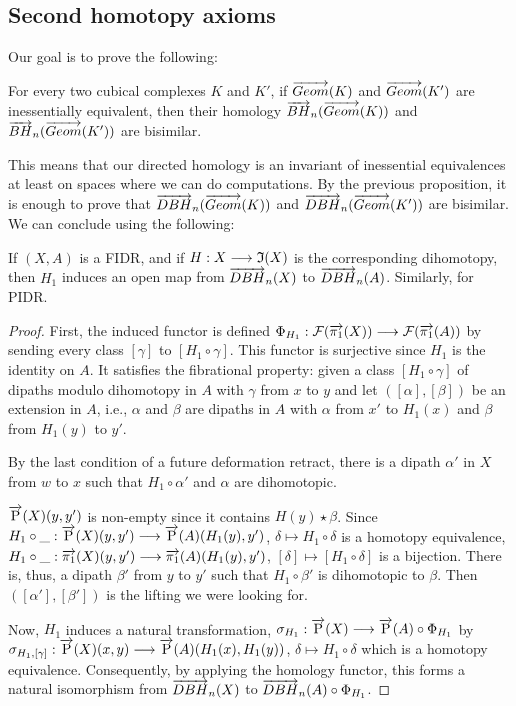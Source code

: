 \subsection{Second homotopy axioms}


Our goal is to prove the following:

\begin{theo}
For every two cubical complexes $K$ and $K'$, if $\overrightarrow{Geom}(K)$ and $\overrightarrow{Geom}(K')$ are inessentially equivalent, then their homology $\overrightarrow{BH}_{n}(\overrightarrow{Geom}(K))$ and $\overrightarrow{BH}_{n}(\overrightarrow{Geom}(K'))$ are bisimilar.
\end{theo}

This means that our directed homology is an invariant of inessential equivalences at least on spaces where we can do computations. By the previous proposition, it is enough to prove that $\overrightarrow{DBH}_{n}(\overrightarrow{Geom}(K))$ and $\overrightarrow{DBH}_{n}(\overrightarrow{Geom}(K'))$ are bisimilar. We can conclude using the following:

\begin{lemme}
If $(X,A)$ is a FIDR, and if $H : X \longrightarrow \mathfrak{I}(X)$ is the corresponding dihomotopy, then $H_1$ induces an open map from $\overrightarrow{DBH}_{n}(X)$ to $\overrightarrow{DBH}_{n}(A)$. Similarly, for PIDR.
\end{lemme}

\begin{proof}
First, the induced functor is defined $\Phi_{H_1} : \mathcal{F}(\overrightarrow{\pi_1}(X)) \longrightarrow \mathcal{F}(\overrightarrow{\pi_1}(A))$ by sending every class $[\gamma]$ to $[H_1\circ\gamma]$. This functor is surjective since $H_1$ is the identity on $A$. It satisfies the fibrational property: given a class $[H_1\circ\gamma]$ of dipaths modulo dihomotopy in $A$ with $\gamma$ from $x$ to $y$ and let $([\alpha],[\beta])$ be an extension in $A$, i.e., $\alpha$ and $\beta$ are dipaths in $A$ with $\alpha$ from $x'$ to $H_1(x)$ and $\beta$ from $H_1(y)$ to $y'$.

By the last condition of a future deformation retract, there is a dipath $\alpha'$ in $X$ from $w$ to $x$ such that $H_1\circ\alpha'$ and $\alpha$ are dihomotopic.

$\overrightarrow{\text{P}}(X)(y,y')$ is non-empty since it contains $H(y)\star\beta$. Since $H_1\circ\_ : \overrightarrow{\text{P}}(X)(y,y') \longrightarrow \overrightarrow{\text{P}}(A)(H_1(y),y')$, $\delta \longmapsto H_1\circ\delta$ is a homotopy equivalence, $H_1\circ\_ : \overrightarrow{\pi_1}(X)(y,y') \longrightarrow \overrightarrow{\pi_1}(A)(H_1(y),y')$, $[\delta] \longmapsto [H_1\circ\delta]$ is a bijection. There is, thus, a dipath $\beta'$ from $y$ to $y'$ such that $H_1\circ\beta'$ is dihomotopic to $\beta$.
Then $([\alpha'],[\beta'])$ is the lifting we were looking for.

Now, $H_1$ induces a natural transformation, $\sigma_{H_1} : \overrightarrow{\text{P}}(X) \longrightarrow \overrightarrow{\text{P}}(A)\circ\Phi_{H_1}$ by $\sigma_{H_1,[\gamma]} : \overrightarrow{\text{P}}(X)(x,y) \longrightarrow \overrightarrow{\text{P}}(A)(H_1(x),H_1(y))$, $\delta \longmapsto H_1\circ\delta$ which is a homotopy equivalence. Consequently, by applying the homology functor, this forms a natural isomorphism from $\overrightarrow{DBH}_{n}(X)$ to $\overrightarrow{DBH}_{n}(A)\circ\Phi_{H_1}$.
\end{proof}

